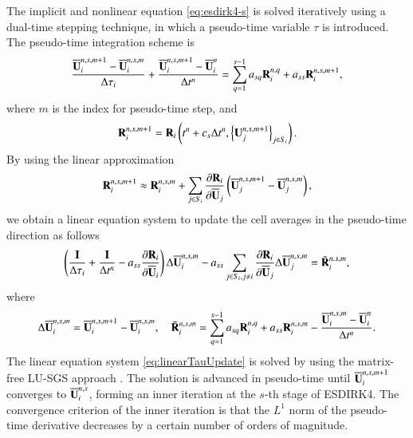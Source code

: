 {The implicit and nonlinear equation \eqref{eq:esdirk4-s} is solved iteratively using a dual-time stepping technique, in which a pseudo-time variable $\tau$ is introduced. The pseudo-time integration scheme is %
\begin{equation}
    \dfrac{\overline{\mathbf{U}}^{n,s,m+1}_i-\overline{\mathbf{U}}^{n,s,m}_i}{\mathrm\Delta \tau_i} + \dfrac{\overline{\mathbf{U}}^{n,s,m+1}_i - \overline{\mathbf{U}}^{n}_i}{\mathrm\Delta t^n} = \sum_{q=1}^{s-1} a_{sq} \mathbf{R}^{n,q}_i + a_{ss} \mathbf{R}_i^{n,s,m+1},
\end{equation}
where $m$ is the index for pseudo-time step, and
\begin{equation}
    \mathbf{R}^{n,s,m+1}_i  = \mathbf{R}_i \left(t^n + c_s \mathrm\Delta t^n, \left\{\mathbf{U}^{n,s,m+1}_j\right\}_{j \in S_i}\right).
\end{equation}
By using the linear approximation
\begin{equation}
    \mathbf{R}^{n,s,m+1}_i \approx \mathbf{R}^{n,s,m}_i + \sum_{j \in S_i} \dfrac{\partial \mathbf{R}_i}{\partial \overline{\mathbf{U}}_j} \left(\overline{\mathbf{U}}^{n,s,m+1}_j-\overline{\mathbf{U}}^{n,s,m}_j\right),
\end{equation}
we obtain a linear equation system to update the cell averages in the pseudo-time direction as follows
\begin{equation}
    \left(\frac{\eye}{\inc \tau_i} + \frac{\eye}{\inc t^n} -a_{ss}\partialderivative{\R_i }{\uu_i} \right) \inc \uu^{n,s, m}_i
    -
    a_{ss}\sum_{j\in S_i,j\neq i} {
        \partialderivative{\R_i}{\uu_j} \inc \uu^{n,s, m}_j
    }
    = \tilde{\R}^{n,s,m}_i,
    \label{eq:linearTauUpdate}
\end{equation}
where
\begin{equation}
    \label{eq:define-inc}
    \mathrm\Delta \overline{\mathbf{U}}^{n,s,m}_i= \overline{\mathbf{U}}^{n,s,m + 1}_i - \overline{\mathbf{U}}^{n,s,m}_i, \quad \tilde{\mathbf{R}}^{n,s,m}_i= \sum_{q=1}^{s-1} a_{sq} \mathbf{R}^{n,q}_i + a_{ss} \mathbf{R}_i^{n,s,m} - \dfrac{\overline{\mathbf{U}}^{n,s,m}_i - \overline{\mathbf{U}}^{n}_i}{\mathrm\Delta t^n}.
\end{equation}
The linear equation system \eqref{eq:linearTauUpdate} is solved by using the matrix-free LU-SGS approach \cite{luo1998fast}. The solution is advanced in pseudo-time until $\overline{\mathbf{U}}^{n,s,m+1}_{i}$ converges to $\overline{\mathbf{U}}^{n,s}_{i}$, forming an inner iteration at the $s$-th stage of ESDIRK4. The convergence criterion of the inner iteration is that the $L^1$ norm of the pseudo-time derivative decreases by a certain number of orders of magnitude.
}

